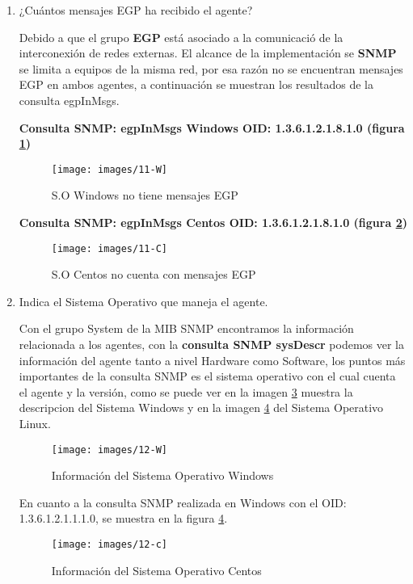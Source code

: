 \begin{enumerate}
\item ¿Cuántos mensajes EGP ha recibido el agente?

Debido a que el grupo  \textbf{EGP} está asociado a la comunicació de la interconexión de redes externas. El alcance de la implementación se  \textbf{SNMP} se limita a equipos de la misma red, por esa razón no se encuentran mensajes EGP en ambos agentes, a continuación se muestran los resultados de la consulta egpInMsgs.


\textbf{Consulta SNMP: egpInMsgs Windows OID: 1.3.6.1.2.1.8.1.0 (figura \ref{image:11-W})}
\FloatBarrier
\begin{figure}[htbp!]
		\centering
	\texttt{[image: images/11-W]}
		\caption{S.O Windows no tiene mensajes EGP}		\label{image:11-W}
\end{figure}
\FloatBarrier


\textbf{Consulta SNMP: egpInMsgs Centos OID: 1.3.6.1.2.1.8.1.0 (figura \ref{image:11-C})}
\FloatBarrier
\begin{figure}[htbp!]
		\centering
	\texttt{[image: images/11-C]}
		\caption{S.O Centos no cuenta con mensajes EGP}		\label{image:11-C}
\end{figure}
\FloatBarrier

\item Indica el Sistema Operativo que maneja el agente.


Con el grupo System de  la MIB SNMP encontramos la información relacionada a los agentes, con la \textbf{consulta SNMP sysDescr} podemos ver la información del agente tanto a nivel Hardware como Software, los puntos más importantes de la consulta SNMP es el sistema operativo con el cual cuenta el agente y la versión, como se puede ver en la imagen  \ref{image:12-W}  muestra la descripcion del Sistema Windows y en la imagen   \ref{image:12-c}   del Sistema Operativo Linux.
 
\FloatBarrier
\begin{figure}[htbp!]
		\centering
	\texttt{[image: images/12-W]}
		\caption{Información del Sistema Operativo Windows}		\label{image:12-W}
\end{figure}
\FloatBarrier

En cuanto a la consulta SNMP realizada en Windows con el OID: 1.3.6.1.2.1.1.1.0, se muestra en la figura \ref{image:12-c}.
\FloatBarrier
\begin{figure}[htbp!]
		\centering
	\texttt{[image: images/12-c]}
		\caption{Información del Sistema Operativo Centos}		\label{image:12-c}
\end{figure}
\FloatBarrier



\end{enumerate}
